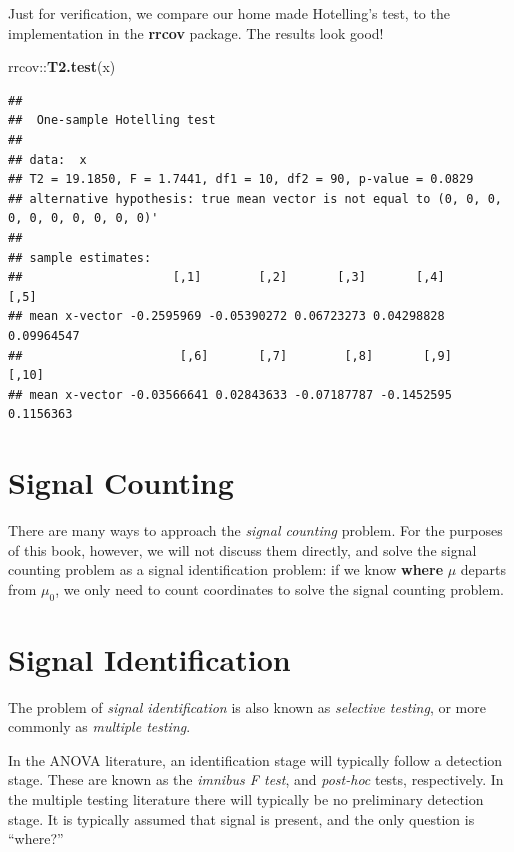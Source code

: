 \documentclass[]{book}
\newenvironment{Shaded}{\begin{snugshade}}{\end{snugshade}}
\newcommand{\KeywordTok}[1]{\textcolor[rgb]{0.13,0.29,0.53}{\textbf{{#1}}}}
\newcommand{\NormalTok}[1]{{#1}}
\theoremstyle{definition}
\theoremstyle{definition}
\theoremstyle{remark}
\begin{document}
Just for verification, we compare our home made Hotelling's test, to the
implementation in the \textbf{rrcov} package. The results look good!

\begin{Shaded}
\begin{Highlighting}[]
\NormalTok{rrcov::}\KeywordTok{T2.test}\NormalTok{(x)}
\end{Highlighting}
\end{Shaded}

\begin{verbatim}
## 
##  One-sample Hotelling test
## 
## data:  x
## T2 = 19.1850, F = 1.7441, df1 = 10, df2 = 90, p-value = 0.0829
## alternative hypothesis: true mean vector is not equal to (0, 0, 0, 0, 0, 0, 0, 0, 0, 0)' 
## 
## sample estimates:
##                     [,1]        [,2]       [,3]       [,4]       [,5]
## mean x-vector -0.2595969 -0.05390272 0.06723273 0.04298828 0.09964547
##                      [,6]       [,7]        [,8]       [,9]     [,10]
## mean x-vector -0.03566641 0.02843633 -0.07187787 -0.1452595 0.1156363
\end{verbatim}

\section{Signal Counting}\label{signal-counting}

There are many ways to approach the \emph{signal counting} problem. For
the purposes of this book, however, we will not discuss them directly,
and solve the signal counting problem as a signal identification
problem: if we know \textbf{where} \(\mu\) departs from \(\mu_0\), we
only need to count coordinates to solve the signal counting problem.

\section{Signal Identification}\label{signal-identification}

The problem of \emph{signal identification} is also known as
\emph{selective testing}, or more commonly as \emph{multiple testing}.

In the ANOVA literature, an identification stage will typically follow a
detection stage. These are known as the \emph{imnibus F test}, and
\emph{post-hoc} tests, respectively. In the multiple testing literature
there will typically be no preliminary detection stage. It is typically
assumed that signal is present, and the only question is ``where?''
\end{document}
